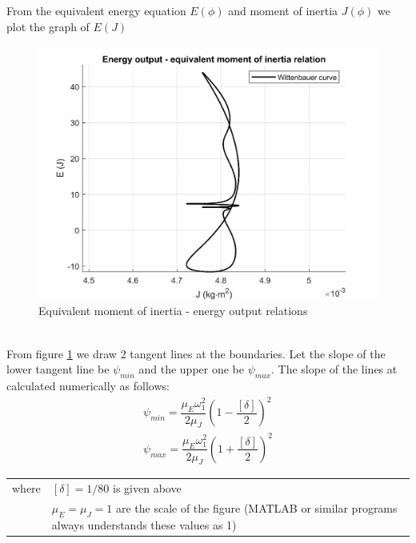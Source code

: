 From the equivalent energy equation $ E(\phi) $ and moment of inertia $ J(\phi) $ we plot the graph of $ E(J) $
\begin{figure}[h]
	\centering
	\includegraphics[width=0.6\linewidth]{21}
	\caption{Equivalent moment of inertia - energy output relations}
	\label{fig:21}
\end{figure}\\
From figure \ref{fig:21} we draw 2 tangent lines at the boundaries. Let the slope of the lower tangent line be $ \psi_{min} $ and the upper one be $ \psi_{max} $. The slope of the lines at calculated numerically as follows:
\begin{equation}
\begin{array}{c}
\psi_{min}=\dfrac{\mu_E\omega_1^2}{2\mu_J}\left(1-\dfrac{[\delta]}{2}\right)^2\\
\psi_{max}=\dfrac{\mu_E\omega_1^2}{2\mu_J}\left(1+\dfrac{[\delta]}{2}\right)^2
\end{array}
\end{equation}
\begin{tabular}{p{2cm}p{13.5cm}}
	where & $ [\delta]=1/80 $ is given above\\
	 & $ \mu_E=\mu_J =1$ are the scale of the figure (MATLAB\textup{\textregistered} or similar programs always understands these values as 1)
\end{tabular}

